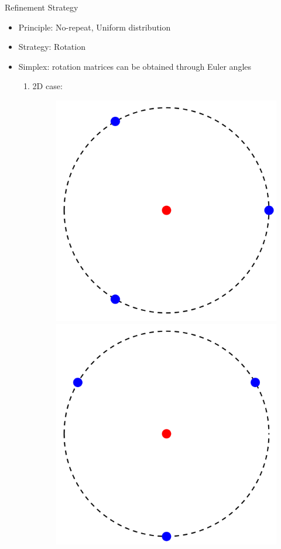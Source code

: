 \documentclass{beamer}
\begin{document}
\begin{frame}{Refinement Strategy}

\begin{itemize}
	\item Principle: No-repeat, Uniform distribution
		\pause
	\item Strategy: Rotation
		\pause
	\item Simplex: rotation matrices can be obtained through Euler angles
	\begin{enumerate}
			\vspace{0.2cm}
		\item 2D case:
	\begin{figure}[!htbp]
		\centering
		  \includegraphics[scale=0.08]{./figures/2D1.png}
		  \includegraphics[scale=0.08]{./figures/2D2.png}

\end{figure}
\end{enumerate}
\end{itemize}
\end{frame}
\end{document}
